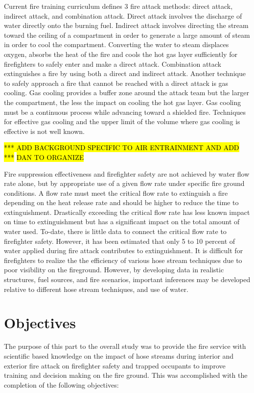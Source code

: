\documentclass{book}
\begin{document}
Current fire training curriculum defines 3 fire attack methods: direct attack, indirect attack, and combination attack. Direct attack involves the discharge of water directly onto the burning fuel. Indirect attack involves directing the stream toward the ceiling of a compartment in order to generate a large amount of steam in order to cool the compartment. Converting the water to steam displaces oxygen, absorbs the heat of the fire and cools the hot gas layer sufficiently for firefighters to safely enter and make a direct attack. Combination attack extinguishes a fire by using both a direct and indirect attack. Another technique to safely approach a fire that cannot be reached with a direct attack is gas cooling. Gas cooling provides a buffer zone around the attack team but the larger the compartment, the less the impact on cooling the hot gas layer. Gas cooling must be a continuous process while advancing toward a shielded fire. Techniques for effective gas cooling and the upper limit of the volume where gas cooling is effective is not well known.  

\hl{*** ADD BACKGROUND SPECIFIC TO AIR ENTRAINMENT AND ADD ***}
\hl{DAN TO ORGANIZE}

Fire suppression effectiveness and firefighter safety are not achieved by water flow rate alone, but by appropriate use of a given flow rate under specific fire ground conditions. A flow rate must meet the critical flow rate to extinguish a fire depending on the heat release rate and should be higher to reduce the time to extinguishment. Drastically exceeding the critical flow rate has less known impact on time to extinguishment but has a significant impact on the total amount of water used. To-date, there is little data to connect the critical flow rate to firefighter safety. However, it has been estimated that only 5 to 10 percent of water applied during fire attack contributes to extinguishment. It is difficult for firefighters to realize the the efficiency of various hose stream techniques due to poor visibility on the fireground. However, by developing data in realistic structures, fuel sources, and fire scenarios, important inferences may be developed relative to different hose stream techniques, and use of water.

\clearpage

\chapter{Objectives}

The purpose of this part to the overall study was to provide the fire service with scientific based knowledge on the impact of hose streams during interior and exterior fire attack on firefighter safety and trapped occupants to improve training and decision making on the fire ground. This was accomplished with the completion of the following objectives:
\end{document}
